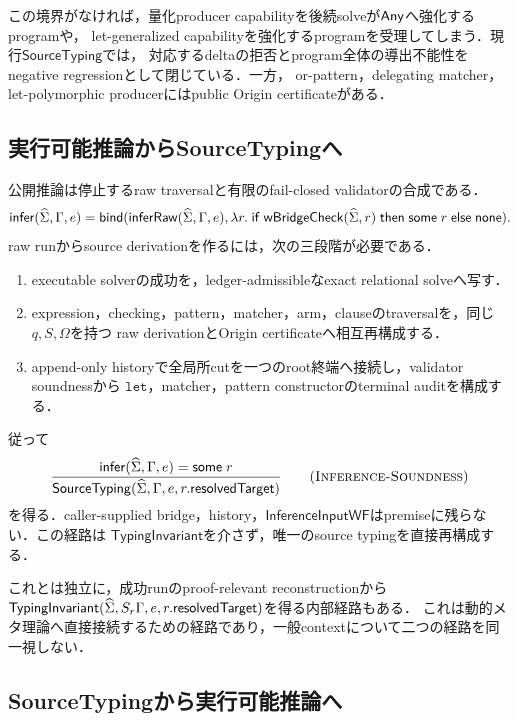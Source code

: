 この境界がなければ，量化producer capabilityを後続solveが$\mathsf{Any}$へ強化するprogramや，
let-generalized capabilityを強化するprogramを受理してしまう．現行$\mathsf{SourceTyping}$では，
対応するdeltaの拒否とprogram全体の導出不能性をnegative regressionとして閉じている．一方，
or-pattern，delegating matcher，let-polymorphic producerにはpublic Origin certificateがある．

\subsection{実行可能推論からSourceTypingへ}

公開推論は停止するraw traversalと有限のfail-closed validatorの合成である．
\[
\mathsf{infer}(\widehat{\Sigma},\Gamma,e)=
\mathsf{bind}(\mathsf{inferRaw}(\widehat{\Sigma},\Gamma,e),
  \lambda r.\;\mathsf{if}\;\mathsf{wBridgeCheck}(\widehat{\Sigma},r)
  \;\mathsf{then}\;\mathsf{some}\;r\;\mathsf{else}\;\mathsf{none}).
\]
raw runからsource derivationを作るには，次の三段階が必要である．

\begin{enumerate}
\item executable solverの成功を，ledger-admissibleなexact relational solveへ写す．
\item expression，checking，pattern，matcher，arm，clauseのtraversalを，同じ$q,S,\Omega$を持つ
  raw derivationとOrigin certificateへ相互再構成する．
\item append-only historyで全局所cutを一つのroot終端へ接続し，validator soundnessから
  $\mathtt{let}$，matcher，pattern constructorのterminal auditを構成する．
\end{enumerate}

従って
\[
\frac{\mathsf{infer}(\Sighat,\Gamma,e)=\mathsf{some}\;r}
{\mathsf{SourceTyping}(\Sighat,\Gamma,e,r.\mathsf{resolvedTarget})}
\tag{\textsc{Inference-Soundness}}
\]
を得る．caller-supplied bridge，history，$\mathsf{InferenceInputWF}$はpremiseに残らない．この経路は
$\mathsf{TypingInvariant}$を介さず，唯一のsource typingを直接再構成する．

これとは独立に，成功runのproof-relevant reconstructionから
$\mathsf{TypingInvariant}(\widehat{\Sigma},S_r\Gamma,e,r.\mathsf{resolvedTarget})$を得る内部経路もある．
これは動的メタ理論へ直接接続するための経路であり，一般contextについて二つの経路を同一視しない．

\subsection{SourceTypingから実行可能推論へ}

